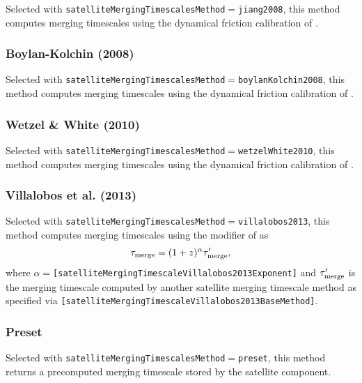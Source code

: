 Selected with {\tt satelliteMergingTimescalesMethod}$=${\tt jiang2008}, this method computes merging timescales using the dynamical friction calibration of \cite{jiang_fitting_2008}.

\subsubsection{Boylan-Kolchin (2008)}\label{phys:satelliteMergingTimescales:satelliteMergingTimescalesBoylanKolchin2008}

Selected with {\tt satelliteMergingTimescalesMethod}$=${\tt boylanKolchin2008}, this method computes merging timescales using the dynamical friction calibration of \cite{boylan-kolchin_dynamical_2008}.

\subsubsection{Wetzel \& White (2010)}\label{phys:satelliteMergingTimescales:satelliteMergingTimescalesWetzelWhite2010}

Selected with {\tt satelliteMergingTimescalesMethod}$=${\tt wetzelWhite2010}, this method computes merging timescales using the dynamical friction calibration of \cite{wetzel_what_2010}.

\subsubsection{Villalobos et al. (2013)}\label{phys:satelliteMergingTimescales:satelliteMergingTimescalesVillalobos2013}

Selected with {\tt satelliteMergingTimescalesMethod}$=${\tt villalobos2013}, this method computes merging timescales using the modifier of \cite{villalobos_improved_2013} as
\begin{equation}
\tau_{\rm merge} = (1+z)^\alpha \tau^\prime_{\rm merge},
\end{equation}
where $\alpha=${\tt [satelliteMergingTimescaleVillalobos2013Exponent]} and $\tau^\prime_{\rm merge}$ is the merging timescale computed by another satellite merging timescale method as specified via {\tt [satelliteMergingTimescaleVillalobos2013BaseMethod]}.

\subsubsection{Preset}\label{phys:satelliteMergingTimescales:satelliteMergingTimescalesPreset}

Selected with {\tt satelliteMergingTimescalesMethod}$=${\tt preset}, this method returns a precomputed merging timescale stored by the satellite component.

